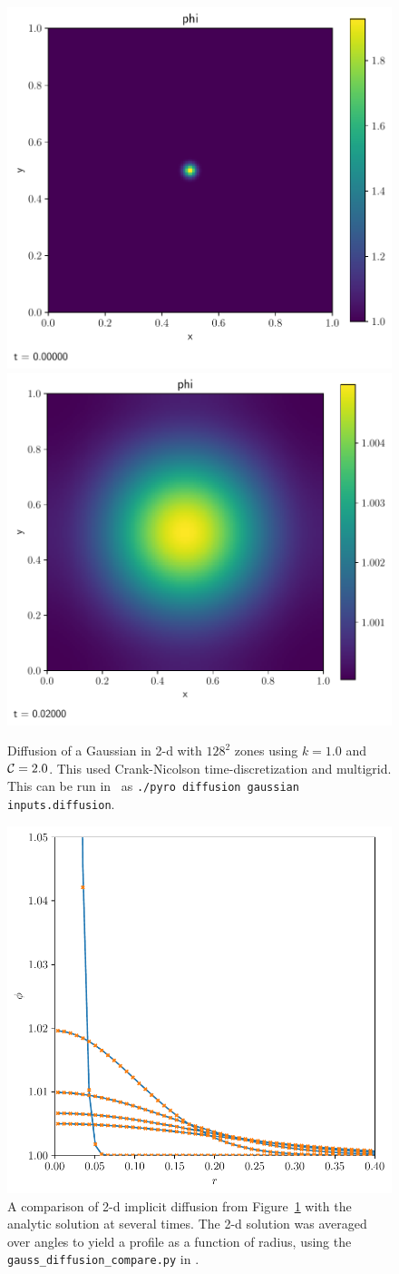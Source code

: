 \begin{figure}[t]
\centering
\includegraphics[width=0.48\linewidth]{gauss_diff_start}
\includegraphics[width=0.48\linewidth]{gauss_diff_end}
\caption[2-d diffusion of a Gaussian]{\label{fig:diff:twodcompare}
  Diffusion of a Gaussian in 2-d with $128^2$ zones using $k = 1.0$
  and ${\mathcal{C}} = 2.0$.  This used Crank-Nicolson time-discretization and
  multigrid.  This can be run in \pyro\ as {\tt ./pyro diffusion
    gaussian inputs.diffusion}.}
\end{figure}

\begin{figure}[t]
\centering
\includegraphics[width=0.8\linewidth]{gauss_diffusion_compare}
\caption[Comparison of 2-d implicit diffusion with analytic
  solution]{\label{fig:diffusion:multid} A comparison of 2-d implicit
  diffusion from Figure~\ref{fig:diff:twodcompare} with the analytic solution at several times.
  The 2-d solution was averaged over angles to yield a profile as a 
  function of radius, using the {\tt
    gauss\_diffusion\_compare.py} in \pyro.}
\end{figure}

